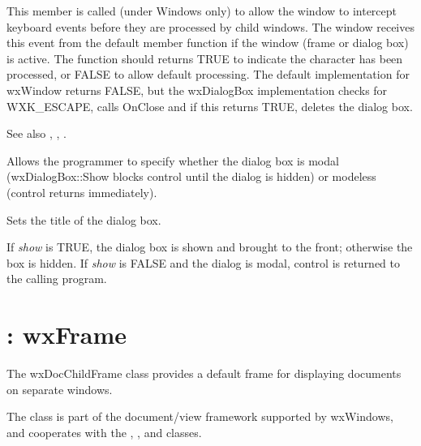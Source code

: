 
This member is called (under Windows only) to allow the window to intercept keyboard events
before they are processed by child windows. The window receives this event from
the default  member function if the window
(frame or dialog box) is active. The function should returns TRUE to indicate the
character has been processed, or FALSE to allow default processing. The default
implementation for wxWindow returns FALSE, but the wxDialogBox implementation
checks for WXK\_ESCAPE, calls OnClose and if this returns TRUE, deletes the dialog box.

See also , ,\rtfsp
{}.



Allows the programmer to specify whether the dialog box is modal (wxDialogBox::Show blocks control
until the dialog is hidden) or modeless (control returns immediately).



Sets the title of the dialog box.



If {\it show} is TRUE, the dialog box is shown and brought to the front;
otherwise the box is hidden. If {\it show} is FALSE and the dialog is
modal, control is returned to the calling program.



\section{: wxFrame}\label{wxdocchildframe}


The wxDocChildFrame class provides a default frame for displaying documents
on separate windows.

The class is part of the document/view framework supported by wxWindows,
and cooperates with the , ,
\rtfsp{} and  classes.


